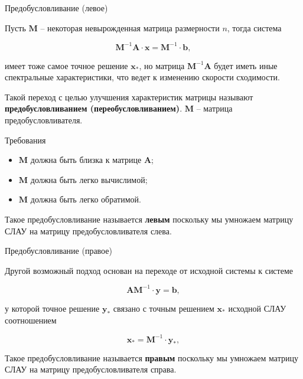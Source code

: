 \documentclass[10pt,xcolor=pst,aspectratio=169]{beamer}
\begin{document}
\begin{frame}{Предобусловливание (левое)}

	\transdissolve[duration=0.2]
	\justifying
	\large
	Пусть $\textbf{M}$ -- некоторая невырожденная матрица размерности $n$, тогда система

	\[
		\textbf{M}^{-1} \textbf{A} \cdot \textbf{x} = \textbf{M}^{-1} \cdot \textbf{b},
	\]

	имеет тоже самое точное решение $\textbf{x}_{*}$, но матрица $\textbf{M}^{-1} \textbf{A}$ будет иметь иные спектральные характеристики, что ведет к изменению скорости сходимости.

	\begin{block}{}
		\justifying
		Такой переход с целью улучшения характеристик матрицы называют \textbf{предобусловливанием (переобусловливанием)}. $\textbf{M}$ -- матрица предобусловливателя.
	\end{block}

\end{frame}

\begin{frame}{Требования}

	\transdissolve[duration=0.2]
	\justifying
	\large
	\begin{itemize}
		\item $\textbf{M}$ должна быть близка к матрице $\textbf{A}$;
		\item $\textbf{M}$ должна быть легко вычислимой;
		\item $\textbf{M}$ должна быть легко обратимой.
	\end{itemize}

	\begin{block}{}
		\justifying
		Такое предобусловливание называется \textbf{левым} поскольку мы умножаем матрицу СЛАУ на матрицу предобусловливателя слева.
	\end{block}

\end{frame}

\begin{frame}{Предобусловливание (правое)}

	\transdissolve[duration=0.2]
	\justifying
	\large
	Другой возможный подход основан на переходе от исходной системы к системе

	\[
		\textbf{A} \textbf{M}^{-1} \cdot \textbf{y} = \textbf{b},
	\]

	у которой точное решение $\textbf{y}_{*}$ связано с точным решением $\textbf{x}_{*}$ исходной СЛАУ соотношением

	\[
		\textbf{x}_{*} = \textbf{M}^{-1} \cdot \textbf{y}_{*},
	\]

	\begin{block}{}
		\justifying
		Такое предобусловливание называется \textbf{правым} поскольку мы умножаем матрицу СЛАУ на матрицу предобусловливателя справа.
	\end{block}

\end{frame}
\end{document}
